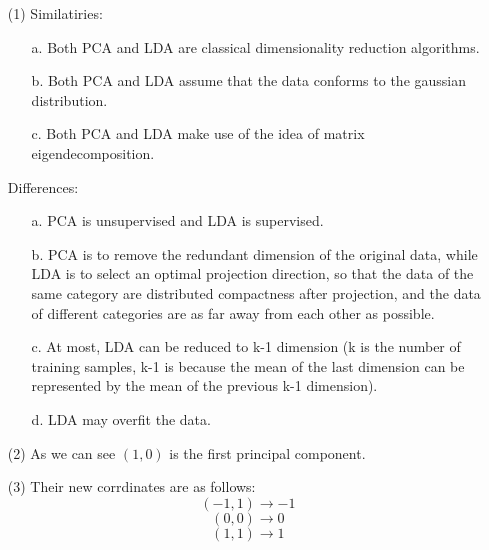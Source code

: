 \begin{solution}
    \begin{enumerate}
        \item[(1)]
            Similatiries:
            \begin{enumerate}
                \item[a.]
                    Both PCA and LDA are classical dimensionality reduction algorithms.
                \item[b.]
                    Both PCA and LDA assume that the data conforms to the gaussian distribution.
                \item[c.]
                    Both PCA and LDA make use of the idea of matrix eigendecomposition.
            \end{enumerate}
            Differences:
            \begin{enumerate}
                \item[a.]
                    PCA is unsupervised and LDA is supervised.
                \item[b.]
                    PCA is to remove the redundant dimension of the original data, while LDA is to select an optimal projection direction, so that the data of the same category are distributed compactness after projection, and the data of different categories are as far away from each other as possible.
                \item[c.]
                    At most, LDA can be reduced to k-1 dimension (k is the number of training samples, k-1 is because the mean of the last dimension can be represented by the mean of the previous k-1 dimension).
                \item[d.]
                    LDA may overfit the data.
            \end{enumerate}
        \item[(2)] As we can see $(1,0)$ is the first principal component.
        \item[(3)] Their new corrdinates are as follows:
            \[(-1,1)\to -1\]
            \[(0,0)\to 0\]
            \[(1,1)\to 1\]
    \end{enumerate}
\end{solution}



